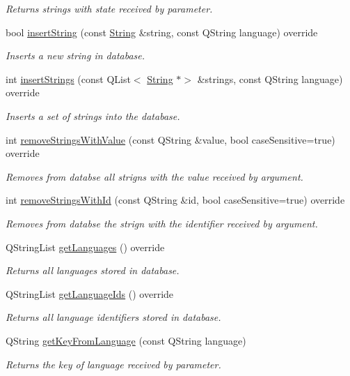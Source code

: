 \begin{DoxyCompactItemize}
\begin{DoxyCompactList}\small\item\em Returns strings with state received by parameter. \end{DoxyCompactList}\item 
bool \mbox{\hyperlink{classMySqlConnector_a4608c0764241969454a55b42873cb86b}{insert\+String}} (const \mbox{\hyperlink{classString}{String}} \&string, const Q\+String language) override
\begin{DoxyCompactList}\small\item\em Inserts a new string in database. \end{DoxyCompactList}\item 
int \mbox{\hyperlink{classMySqlConnector_a77a5169dd8a515b613642c88dac9798b}{insert\+Strings}} (const Q\+List$<$ \mbox{\hyperlink{classString}{String}} $\ast$$>$ \&strings, const Q\+String language) override
\begin{DoxyCompactList}\small\item\em Inserts a set of strings into the database. \end{DoxyCompactList}\item 
int \mbox{\hyperlink{classMySqlConnector_a528aac591ea56ade27a096bb997abb2a}{remove\+Strings\+With\+Value}} (const Q\+String \&value, bool case\+Sensitive=true) override
\begin{DoxyCompactList}\small\item\em Removes from databse all strigns with the value received by argument. \end{DoxyCompactList}\item 
int \mbox{\hyperlink{classMySqlConnector_a3c340e5310c56410d64ecd89e5cf6661}{remove\+Strings\+With\+Id}} (const Q\+String \&id, bool case\+Sensitive=true) override
\begin{DoxyCompactList}\small\item\em Removes from databse the strign with the identifier received by argument. \end{DoxyCompactList}\item 
Q\+String\+List \mbox{\hyperlink{classMySqlConnector_a83be1a4d67e509b6604629660eb7c4a0}{get\+Languages}} () override
\begin{DoxyCompactList}\small\item\em Returns all languages stored in database. \end{DoxyCompactList}\item 
Q\+String\+List \mbox{\hyperlink{classMySqlConnector_a3493828360c7edd217461e040fc1b00e}{get\+Language\+Ids}} () override
\begin{DoxyCompactList}\small\item\em Returns all language identifiers stored in database. \end{DoxyCompactList}\item 
Q\+String \mbox{\hyperlink{classMySqlConnector_a16a6f0883e2b384621e738f78c619af6}{get\+Key\+From\+Language}} (const Q\+String language)
\begin{DoxyCompactList}\small\item\em Returns the key of language received by parameter. \end{DoxyCompactList}\end{DoxyCompactItemize}
